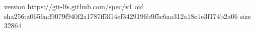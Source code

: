 version https://git-lfs.github.com/spec/v1
oid sha256:a0656ad9079f940f2a1787ff3f14ef3429196b9f5c6aa312a18e1e3f174b2a06
size 32864
